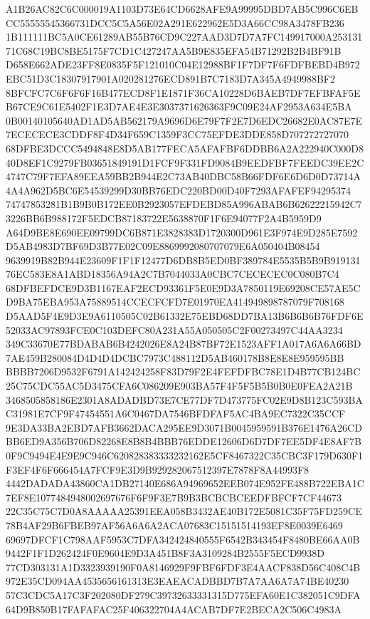 \documentclass[UTF8,fontset=fandol,zihao=-4,a4paper]{ctexart}
\begin{document}
{{A1B26AC82C6C000019A1103D73E64CD6628AFE9A99995DBD7AB5C996C6EBCC55555545366731DCC5C5A56E02A291E622962E5D3A66CC98A3478FB236
1B111111BC5A0CE61289AB55B76CD9C227AAD3D7D7A7FC149917000A25313171C68C19BC8BE5175F7CD1C427247AA5B9E835EFA54B71292B2B4BF91B
D658E662ADE23FF8E0835F5F121010C04E12988BF1F7DF7F6FDFBEBD4B972EBC51D3C18307917901A020281276ECD891B7C7183D7A345A4949988BF2
8BFCFC7C6F6F6F16B477ECD8F1E1871F36CA10228D6BAEB7DF7EFBFAF5EB67CE9C61E5402F1E3D7AE4E3E3037371626363F9C09E24AF2953A634E5BA
0B00140105640AD1AD5AB562179A9696D6E79F7F2E7D6EDC26682E0AC87E7E7ECECECE3CDDF8F4D34F659C1359F3CC75EFDE3DDE858D707272727070
68DFBE3DCCC5494848E8D5AB177FECA5AFAFBF6DDBB6A2A222940C000D840D8EF1C9279FB03651849191D1FCF9F331FD9084B9EEDFBF7FEEDC39EE2C
4747C79F7EFA89EEA59BB2B944E2C73AB40DBC58B66FDF6E6D6D0D73714A4A4A962D5BC6E54539299D30BB76EDC220BD00D40F7293AFAFEF94295374
74747853281B1B9B0B172EE0B2923057EFDEBD85A996ABAB6B62622215942C73226BB6B988172F5EDCB87183722E5638870F1F6E94077F2A4B5959D9
A64D9BE8E690EE09799DC6B871E3828383D1720300D961E3F974E9D285E7592D5AB4983D7BF69D3B77E02C09E8869992080707079E6A050404B08454
9639919B82B944E23609F1F1F12477D6DB8B5ED0BF389784E5535B5B9B91913176EC583E8A1ABD18356A94A2C7B7044033A0CBC7CECECEC0C080B7C4
68DFBEFDCE9D3B1167EAF2ECD93361F5E0E9D3A7850119E69208CE57AE5CD9BA75EBA953A75889514CCECFCFD7E01970EA414949898787079F708168
D5AAD5F4E9D3E9A6110505C02B61332E75EBD68DD7BA13B6B6B6B76FDF6E52033AC97893FCE0C103DEFC80A231A55A050505C2F00273497C44AA3234
349C33670E77BDABAB6B4242026E8A24B87BF72E1523AFF1A017A6A6A66BD7AE459B280084D4D4D4DCBC7973C488112D5AB460178B8E8E8E959595BB
BBBB7206D9532F6791A142424258F83D79F2E4FEFDFBC78E1D4B77CB124BC25C75CDC55AC5D3475CFA6C086209E903BA57F4F5F5B5B0B0E0FEA2A21B
3468505858186E2301A8ADADBD73E7CE77DF7D473775FC02E9D8B123C593BAC31981E7CF9F47454551A6C0467DA7546BFDFAF5AC4BA9EC7322C35CCF
9E3DA33BA2EBD7AFB3662DACA295EE9D3071B0045959591B376E1476A26CDBB6ED9A356B706D82268E8B8B4BBB76EDDE12606D6D7DF7EE5DF4E8AF7B
0F9C9494E4E9E9C946C620828383333232162E5CF8467322C35CBC3F179D630F1F3EF4F6F666454A7FCF9E3D9B929282067512397E7878F8A44993F8
4442DADADA43860CA1DB27140E686A94969652EEB074E952FE488B722EBA1C7EF8E1077484948002697676F6F9F3E7B9B3BCBCBCEEDFBFCF7CF44673
22C35C75C7D0A8AAAAA25391EEA058B3432AE40B172E5081C35F75FD259CE78B4AF29B6FBEB97AF56A6A6A2ACA07683C15151514193EF8E0039E6469
69697DFCF1C798AAF5953C7DFA342424840555F6542B343454F8480BE66AA0B9442F1F1D262424F0E9604E9D3A451B8F3A3109284B2555F5ECD9938D
77CD303131A1D3323939190F0A8146929F9FBF6FDF3E4AACF838D56C408C4B972E35CD094AA4535656161313E3EAEACADBBD7B7A7AA6A7A74BE40230
57C3CDC5A17C3F202080DF279C39732633331315D775EFA60E1C382051C9DFA64D9B850B17FAFAFAC25F406322704A4ACAB7DF7E2BECA2C506C4983A
}}
\end{document}

